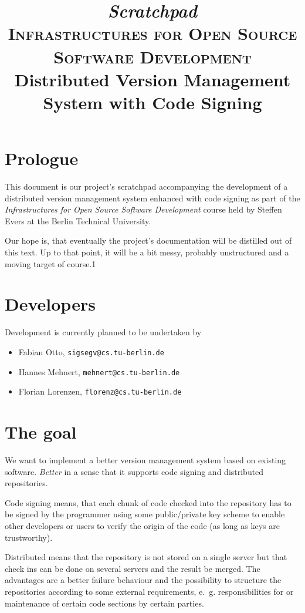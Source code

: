 \documentclass[fleqn, german, 10pt, a4paper]{article}
\begin{document}
\title{\emph{Scratchpad}\\
{\scshape Infrastructures for Open Source Software Development}\\
Distributed Version Management System with Code Signing}
\maketitle

\tableofcontents

\section{Prologue}
This document is our project's scratchpad accompanying the development
of a distributed version management system enhanced with code signing as
part of the \emph{Infrastructures for Open Source Software Development}
course held by Steffen Evers at the Berlin Technical University.

Our hope is, that eventually the project's documentation will be
distilled out of this text. Up to that point, it will be a bit messy,
probably unstructured and a moving target of course.1

\section{Developers}
Development is currently planned to be undertaken by
\begin{itemize}
\item Fabian Otto, \texttt{sigsegv@cs.tu-berlin.de}
\item Hannes Mehnert, \texttt{mehnert@cs.tu-berlin.de}
\item Florian Lorenzen, \texttt{florenz@cs.tu-berlin.de}
\end{itemize}

\section{The goal}
We want to implement a better version management system based on
existing software. \emph{Better} in a sense that it supports
code signing and distributed repositories.

Code signing means, that each chunk of code checked into the repository
has to be signed by the programmer using some public/private key scheme
to enable other developers or users to verify the origin of the code (as
long as keys are trustworthy).

Distributed means that the repository is not stored on a single server
but that check ins can be done on several servers and the result be
merged. The advantages are a better failure behaviour and the
possibility to structure the repositories according to some external
requirements, e.~g. responsibilities for or maintenance of certain code
sections by certain parties.
\end{document}
